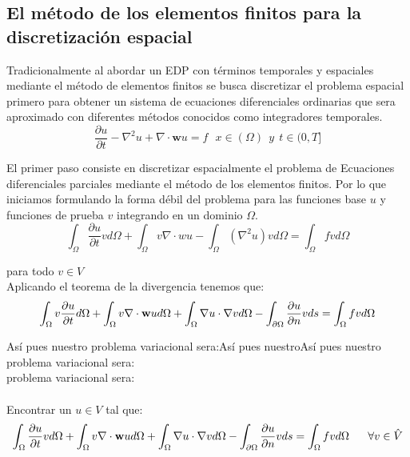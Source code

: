 \documentclass[11pt, spanish]{article}
\begin{document}
\subsection{El m\'etodo de los elementos finitos para la discretizaci\'on espacial}

Tradicionalmente al abordar un EDP con t\'erminos temporales y espaciales mediante el m\'etodo de elementos finitos se busca discretizar el problema espacial primero para obtener un sistema de ecuaciones diferenciales ordinarias que sera aproximado con diferentes m\'etodos conocidos como integradores temporales.  \\


\begin{equation}
	\frac{\partial u}{\partial t}-\nabla^2 u + \nabla \cdot \textbf{w} u = f  \ \ \ x \in (\Omega) \ \  y \ \ t \in (0,T]
	\label{PDE}
\end{equation}


El primer paso consiste en discretizar espacialmente el problema de Ecuaciones diferenciales parciales mediante el m\'etodo de los elementos finitos. Por lo que  iniciamos formulando la forma d\'ebil del problema para las funciones base $u$ y funciones de prueba $v$ integrando en un dominio $\Omega$.
\begin{equation}
	\int_\Omega \frac{\partial u}{\partial t}v d \Omega + \int_\Omega v \nabla \cdot wu  -\int_\Omega (\nabla^2 u)v d \Omega= \int_\Omega fv d \Omega
\end{equation}

para todo  $v \in V$\\

Aplicando el teorema de la divergencia tenemos que: 
\begin{equation}
	\int_\Omega v \frac{\partial u}{\partial t} d \Omega +  \int_\Omega v \nabla \cdot \mathbf{w}u d \Omega + \int_\Omega\nabla u\cdot\nabla v d \Omega- \int_{\partial\Omega}{\partial u\over
		\partial n}v ds = \int_\Omega fv d \Omega
\end{equation}

As\'i pues nuestro problema variacional sera:As\'i pues nuestroAs\'i pues nuestro problema variacional sera: \\ problema variacional sera: \\ \\

Encontrar un $u \in V$ tal que:  
\begin{equation}
	\int_\Omega \frac{\partial u}{\partial t}v d \Omega +  \int_\Omega v \nabla \cdot \mathbf{w}u d \Omega+ \int_\Omega\nabla u\cdot\nabla v d \Omega- \int_{\partial\Omega}{\partial u\over
		\partial n}v ds = \int_\Omega fv d \Omega \ \ \ \ \  \forall v \in \hat{V}
\end{equation}
\end{document}
